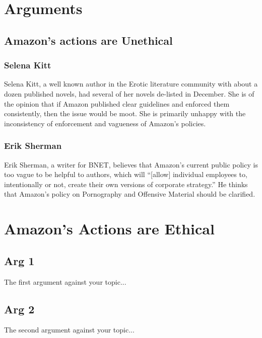 \documentclass[11pt]{article}
\begin{document}
\begin{multicols}{2}
\section{Arguments}

\subsection{Amazon's actions are Unethical}

\subsubsection{Selena Kitt}
Selena Kitt, a well known author in the Erotic literature community with about a dozen published novels, had several of her novels de-listed in December.  She is of the opinion that if Amazon published clear guidelines and enforced them consistently, then the issue would be moot.  She is primarily unhappy with the inconsistency of enforcement and vagueness of Amazon's policies. \cite{KittSelfPubRevolution}

\subsubsection{Erik Sherman}
Erik Sherman, a writer for BNET, believes that Amazon's current public policy is too vague to be helpful to authors, which will ``[allow] individual employees to, intentionally or not, create their own versions of corporate strategy.'' He thinks that Amazon's policy on Pornography and Offensive Material should be clarified. \cite{ShermanAmazonExecs}

\section{Amazon's Actions are Ethical}
\subsection{Arg 1}
The first argument against your topic...
\subsection{Arg 2}
The second argument against your topic...



\end{multicols}
\end{document}
